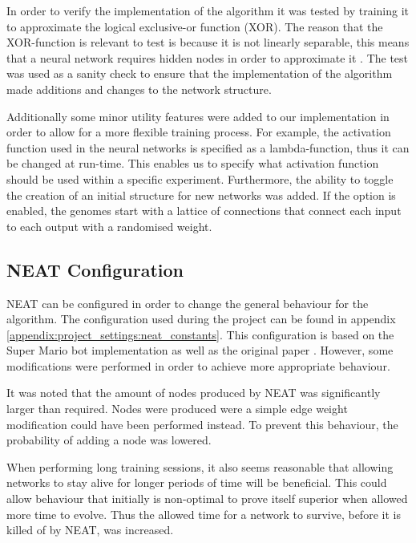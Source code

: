 In order to verify the implementation of the algorithm it was tested by training it to approximate the logical exclusive-or function (XOR). The reason that the XOR-function is relevant to test is because it is not linearly separable, this means that a neural network requires hidden nodes in order to approximate it \cite{haykin:xor, stanley:neat}. The test was used as a sanity check to ensure that the implementation of the algorithm made additions and changes to the network structure. 

Additionally some minor utility features were added to our implementation in order to allow for a more flexible training process. For example, the activation function used in the neural networks is specified as a lambda-function, thus it can be changed at run-time. This enables us to specify what activation function should be used within a specific experiment. Furthermore, the ability to toggle the creation of an initial structure for new networks was added. If the option is enabled, the genomes start with a lattice of connections that connect each input to each output with a randomised weight.

\subsection{NEAT Configuration}
NEAT can be configured in order to change the general behaviour for the algorithm. The configuration used during the project can be found in appendix \ref{appendix:project_settings:neat_constants}. This configuration is based on the Super Mario bot implementation \cite{mario_source} as well as the original paper \cite{stanley:neat}. However, some modifications were performed in order to achieve more appropriate behaviour.

It was noted that the amount of nodes produced by NEAT was significantly larger than required. Nodes were produced were a simple edge weight modification could have been performed instead. To prevent this behaviour, the probability of adding a node was lowered.

When performing long training sessions, it also seems reasonable that allowing networks to stay alive for longer periods of time will be beneficial. This could allow behaviour that initially is non-optimal to prove itself superior when allowed more time to evolve. Thus the allowed time for a network to survive, before it is killed of by NEAT, was increased.



